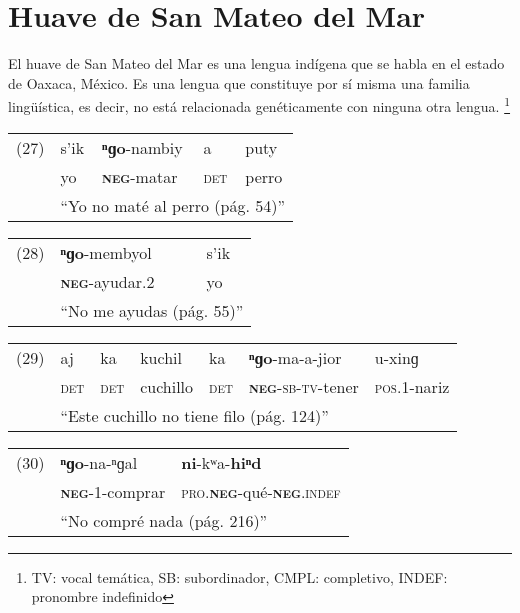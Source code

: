 \section*{Huave de San Mateo del Mar}

\noindent El huave de San Mateo del Mar es una lengua indígena que se habla en el estado de Oaxaca, México. Es una lengua que constituye por sí misma una familia lingüística, es decir, no está relacionada genéticamente con ninguna otra lengua.
\footnote{TV: vocal temática, SB: subordinador, CMPL: completivo, INDEF: pronombre indefinido}
\vspace{0.5cm}

{\setmainfont{Charis SIL}

\begin{tabular}{lllll}
 (27) & s'ik & \textbf{ⁿɡo}-nambiy & a & puty\\
& yo & \textsc{\textbf{neg}}-matar & \textsc{det} & perro \\
& \multicolumn{4}{l}{``Yo no maté al perro (pág. 54)''}
\end{tabular}\vspace{0.5cm}

\begin{tabular}{lll}
(28) & \textbf{ⁿɡo}-membyol & s'ik \\
& \textsc{\textbf{neg}}-ayudar.2 & yo \\
& \multicolumn{2}{l}{``No me ayudas (pág. 55)''} \\
\end{tabular} \vspace{0.5cm}

\begin{tabular}{lllllll}
(29) & aj & ka & kuchil & ka & \textbf{ⁿɡo}-ma-a-jior & u-xinɡ \\
& \textsc{det} & \textsc{det} & cuchillo & \textsc{det} & \textsc{\textbf{neg}-sb-tv}-tener & \textsc{pos.1}-nariz \\
& \multicolumn{6}{l}{``Este cuchillo no tiene filo (pág. 124)''} \\
\end{tabular} \vspace{0.5cm}

\begin{tabular}{lll}
(30) & \textbf{ⁿɡo}-na-ⁿɡal & \textbf{ni}-kʷa-\textbf{hiⁿd} \\
& \textsc{\textbf{neg}}-1-comprar & \textsc{pro.\textbf{neg}}-qué-\textsc{\textbf{neg}.indef} \\
& \multicolumn{2}{l}{``No compré nada (pág. 216)''} \\
\end{tabular} \vspace{0.5cm}

}
